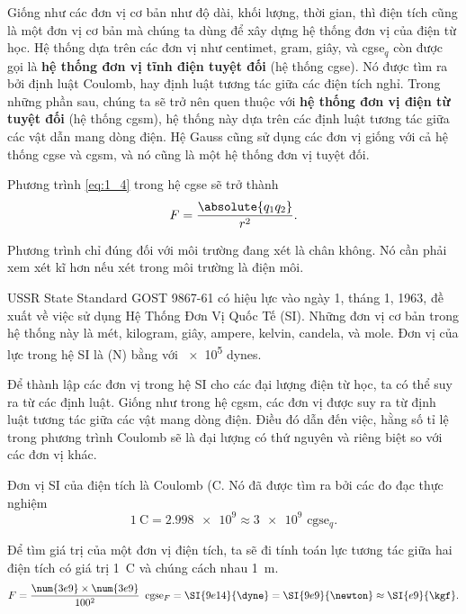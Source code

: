 Giống như các đơn vị cơ bản như độ dài, khối lượng, thời gian, thì điện tích cũng là một đơn vị cơ bản mà chúng ta dùng để xây dựng hệ thống đơn vị của điện từ học. Hệ thống dựa trên các đơn vị như centimet, gram, giây, và cgse$_q$ còn được gọi là \textbf{hệ thống đơn vị tĩnh điện tuyệt đối} (hệ thống cgse). Nó được tìm ra bởi định luật Coulomb, hay định luật tương tác giữa các điện tích nghỉ. Trong những phần sau, chúng ta sẽ trở nên quen thuộc với \textbf{hệ thống đơn vị điện từ tuyệt đối} (hệ thống cgsm), hệ thống này dựa trên các định luật tương tác giữa các vật dẫn mang dòng điện. Hệ Gauss cũng sử dụng các đơn vị giống với cả hệ thống cgse và cgsm, và nó cũng là một hệ thống đơn vị tuyệt đối.

Phương trình \eqref{eq:1_4} trong hệ cgse sẽ trở thành
\begin{equation}\label{eq:1_7}
	F = \frac{\absolute{q_1 q_2}}{r^2}.
\end{equation}

\noindent
Phương trình chỉ đúng đối với môi trường đang xét là chân không. Nó cần phải xem xét kĩ hơn nếu xét trong môi trường là điện môi.

USSR State Standard GOST 9867-61 có hiệu lực vào ngày 1, tháng 1, 1963, đề xuất về việc sử dụng Hệ Thống Đơn Vị Quốc Tế (SI). Những đơn vị cơ bản trong hệ thống này là mét, kilogram, giây, ampere, kelvin, candela, và mole. Đơn vị của lực trong hệ SI là (\si{\newton}) bằng với \num{e5} dynes. 

Để thành lập các đơn vị trong hệ SI cho các đại lượng điện từ học, ta có thể suy ra từ các định luật. Giống như trong hệ cgsm, các đơn vị được suy ra từ định luật tương tác giữa các vật mang dòng điện. Điều đó dẫn đến việc, hằng số tỉ lệ trong phương trình Coulomb sẽ là đại lượng có thứ nguyên và riêng biệt so với các đơn vị khác.

Đơn vị SI của điện tích là Coulomb (\si{\coulomb}. Nó đã được tìm ra bởi các đo đạc thực nghiệm
\begin{equation}\label{eq:1_8}
	\SI{1}{\coulomb} = \num{2.998e9} \approx \num{3e9}{\text{ cgse$_q$}}.
\end{equation}

Để tìm giá trị của một đơn vị điện tích, ta sẽ đi tính toán lực tương tác giữa hai điện tích có giá trị \SI{1}{\coulomb} và chúng cách nhau \SI{1}{\metre}.
\begin{equation}\label{eq:1_9}
	F = \frac{\num{3e9}\times\num{3e9}}{100^2}\,\text{ cgse$_F$} = \SI{9e14}{\dyne} = \SI{9e9}{\newton} \approx \SI{e9}{\kgf}.
\end{equation}

